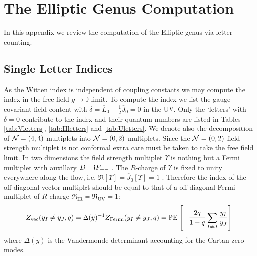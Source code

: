 \documentclass[main.tex]{subfiles}
\begin{document}
\section{The Elliptic Genus Computation}\label{App:EllipticGenus1}
In this appendix we review the computation of the Elliptic genus via letter counting. 
\subsection{Single Letter Indices}
As the Witten index is independent of coupling constants we may compute the index in the free field $g\to0$ limit. 
To compute the index we list the gauge covariant field content with $\delta=\overline{L}_0-\frac{1}{2}\overline{J}_0=0$ in the UV. Only the `letters' with $\delta=0$ contribute to the index and their
quantum numbers are listed in Tables \ref{tab:Vletters}, \ref{tab:Hletters} and \ref{tab:Uletters}. We denote also the decomposition of $\mathcal{N}=(4,4)$ multiplets into $\mathcal{N}=(0,2)$ multiplets.
Since the $\mathcal{N}=(0,2)$ field strength multiplet is not conformal extra care must be taken to take the free field limit. In two dimensions the field strength multiplet $\Upsilon$ is nothing but a Fermi multiplet with auxillary $D-\mathrm{i} F_{+-}$ . The $R$-charge of $\Upsilon$ is fixed to unity everywhere along the flow, i.e. $\mathfrak{R}\left[\Upsilon\right]=\overline{J}_0\left[\Upsilon\right]=1$ . Therefore the index of the off-diagonal vector multiplet should be equal to that of a off-diagonal Fermi multiplet of $R$-charge $\mathfrak{R}_{\text{IR}}=\mathfrak{R}_{\text{UV}}=1$:
\begin{equation}
Z_{\text{vec}}(y_I\neq y_J,q)=\Delta(y)^{-1}Z_{\text{Fermi}}(y_I\neq y_J,q)=\operatorname{\mathrm{PE}}\left[-\frac{2q}{1-q}\sum_{I\neq J}\frac{y_I}{y_J}\right]
\end{equation}
where $\Delta(y)$ is the Vandermonde determinant accounting for the Cartan zero modes.
\renewcommand{\arraystretch}{1.5}
\end{document}
